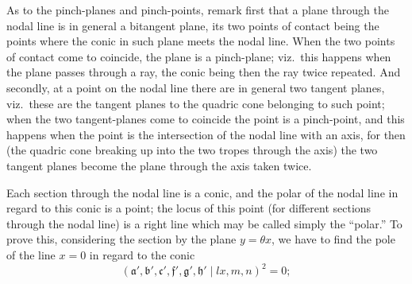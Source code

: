 \documentclass[11pt,a4paper]{article}
\begin{document}
\begin{center}
\end{center}

As to the pinch-planes and pinch-points, remark first that a plane through the nodal line is in general a bitangent plane, its two points of contact being the points where the conic in such plane meets the nodal line. When the two points of contact come to coincide, the plane is a pinch-plane; viz.\ this happens when the plane passes through a ray, the conic being then the ray twice repeated. And secondly, at a point on the nodal line there are in general two tangent planes, viz.\ these are the tangent planes to the quadric cone belonging to such point; when the two tangent-planes come to coincide the point is a pinch-point, and this happens when the point is the intersection of the nodal line with an axis, for then (the quadric cone breaking up into the two tropes through the axis) the two tangent planes become the plane through the axis taken twice.

Each section through the nodal line is a conic, and the polar of the nodal line in regard to this conic is a point; the locus of this point (for different sections through the nodal line) is a right line which may be called simply the ``polar.'' To prove this, considering the section by the plane $y = \theta x$, we have to find the pole of the line $x = 0$ in regard to the conic
\[
(\mathfrak{a}', \mathfrak{b}', \mathfrak{c}', \mathfrak{f}', \mathfrak{g}', \mathfrak{h}' \mid lx, m, n)^2 = 0;
\]
\end{document}
